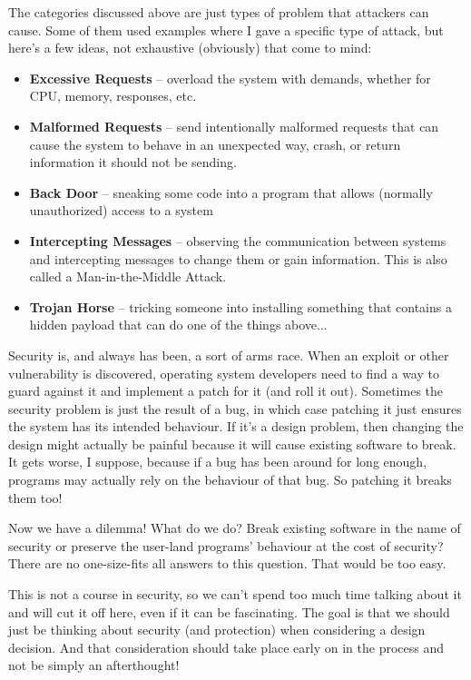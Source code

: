 The categories discussed above are just types of problem that attackers can cause. Some of them used examples where I gave a specific type of attack, but here's a few ideas, not exhaustive (obviously) that come to mind:

\begin{itemize}
	\item \textbf{Excessive Requests} -- overload the system with demands, whether for CPU, memory, responses, etc.
	\item \textbf{Malformed Requests} -- send intentionally malformed requests that can cause the system to behave in an unexpected way, crash, or return information it should not be sending.
	\item \textbf{Back Door} -- sneaking some code into a program that allows (normally unauthorized) access to a system
	\item \textbf{Intercepting Messages} -- observing the communication between systems and intercepting messages to change them or gain information. This is also called a Man-in-the-Middle Attack.
	\item \textbf{Trojan Horse} -- tricking someone into installing something that contains a hidden payload that can do one of the things above...
\end{itemize}

Security is, and always has been, a sort of arms race. When an exploit or other vulnerability is discovered, operating system developers need to find a way to guard against it and implement a patch for it (and roll it out). Sometimes the security problem is just the result of a bug, in which case patching it just ensures the system has its intended behaviour. If it's a design problem, then changing the design might actually be painful because it will cause existing software to break. It gets worse, I suppose, because if a bug has been around for long enough, programs may actually rely on the behaviour of that bug. So patching it breaks them too!

Now we have a dilemma! What do we do? Break existing software in the name of security or preserve the user-land programs' behaviour at the cost of security? There are no one-size-fits all answers to this question. That would be too easy.

This is not a course in security, so we can't spend too much time talking about it and will cut it off here, even if it can be fascinating. The goal is that we should just be thinking about security (and protection) when considering a design decision. And that consideration should take place early on in the process and not be simply an afterthought!



